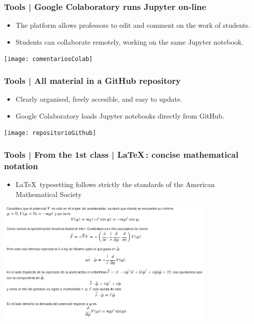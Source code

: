 \documentclass[aspectratio=169]{beamer}
\begin{document}
\begin{frame}
	\frametitle{Tools | Google Colaboratory runs Jupyter on-line}
	\begin{block}{}
		\begin{itemize}
			\item The platform allows professors to edit and comment on the work of students.
			\item Students can collaborate remotely, working on the same Jupyter notebook.
		\end{itemize}
	\texttt{[image: comentariosColab]}
	\end{block}
\end{frame}


\begin{frame}
	\frametitle{Tools | All material in a GitHub repository}
	\begin{block}{}
		\begin{itemize}
			\item Clearly organised, freely accesible, and easy to update.
			\item Google Colaboratory loads Jupyter notebooks directly from GitHub.
		\end{itemize}
	\texttt{[image: repositorioGithub]}
	\end{block}
\end{frame}


\begin{frame}
	\frametitle{Tools | From the 1st class | \LaTeX \,: concise mathematical notation}
	\begin{block}{}
		\begin{itemize}
			\item \LaTeX \, typesetting follows strictly the standards of the American Mathematical Society
		\end{itemize}
	\includegraphics[width= 0.8\textwidth]{clase1péndulo}
	\end{block}
\end{frame}
\end{document}
